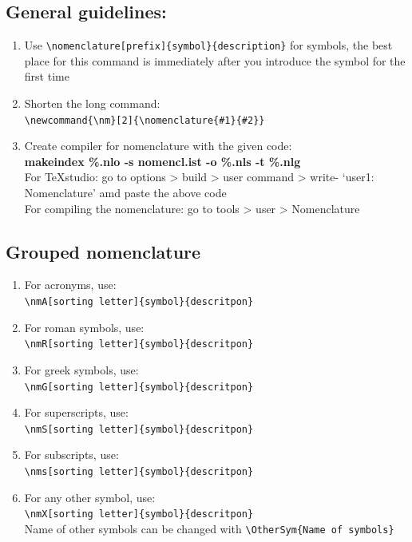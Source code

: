 \subsection{General guidelines:}
\begin{enumerate}	
	\item Use \verb|\nomenclature[prefix]{symbol}{description}| for symbols, the best place for this command is immediately after you introduce the symbol for the first time
	\item Shorten the long command:\\ \verb|\newcommand{\nm}[2]{\nomenclature{#1}{#2}}|
	\item Create compiler for nomenclature with the given code: \\
	\textbf{makeindex \%.nlo -s nomencl.ist -o \%.nls -t \%.nlg }\\
	For TeXstudio: go to options > build > user command > write- `user1: Nomenclature' amd paste the above code\\
	For compiling the nomenclature: go to tools > user > Nomenclature	
\end{enumerate}	

\subsection{Grouped nomenclature}
\begin{enumerate}
\item For acronyms, use:\\
 \verb|\nmA[sorting letter]{symbol}{descritpon}|
\item For roman symbols, use:\\
\verb|\nmR[sorting letter]{symbol}{descritpon}|
\item For greek symbols, use:\\
 \verb|\nmG[sorting letter]{symbol}{descritpon}|
 \item For superscripts, use:\\
 \verb|\nmS[sorting letter]{symbol}{descritpon}|
 \item For subscripts, use:\\
 \verb|\nms[sorting letter]{symbol}{descritpon}| 
 \item For any other symbol, use:\\
 \verb|\nmX[sorting letter]{symbol}{descritpon}|\\
 Name of other symbols can be changed with \verb|\OtherSym{Name of symbols}|
\end{enumerate}
